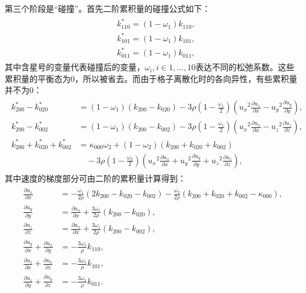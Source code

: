 第三个阶段是“碰撞”。首先二阶累积量的碰撞公式如下：
\begin{align}
    \begin{split}
& k_{110}^{*}=\left(1-\omega_{1}\right) k_{110}, \\
& k_{101}^{*}=\left(1-\omega_{1}\right) k_{101}, \\
& k_{011}^{*}=\left(1-\omega_{1}\right) k_{011} ,
\end{split}
\end{align}
其中含星号的变量代表碰撞后的变量，$\omega_{i}, i \in {1,\dots,10}$表达不同的松弛系数。这些累积量的平衡态为0，所以被省去。而由于格子离散化时的各向异性，有些累积量并不为0：
\begin{align}
    \begin{split}
k_{200}^{*}-k_{020}^{*} & =\left(1-\omega_{1}\right)\left(k_{200}-k_{020}\right)-3 \rho\left(1-\frac{\omega_{1}}{2}\right)\left({u_x}^{2} \frac{\partial u_x}{\partial x}-{u_y}^{2} \frac{\partial u_y}{\partial y}\right), \\
k_{200}^{*}-k_{002}^{*} & =\left(1-\omega_{1}\right)\left(k_{200}-k_{002}\right)-3 \rho\left(1-\frac{\omega_{1}}{2}\right)\left({u_x}^{2} \frac{\partial u_x}{\partial x}-{u_z}^{2} \frac{\partial u_z}{\partial z}\right), \\
k_{200}^{*}+k_{020}^{*}+k_{002}^{*} & =\kappa_{000} \omega_{2}+\left(1-\omega_{2}\right)\left(k_{200}+k_{020}+k_{002}\right) \\
&\quad -3 \rho\left(1-\frac{\omega_{2}}{2}\right)\left({u_x}^{2} \frac{\partial u_x}{\partial x}+{u_y}^{2} \frac{\partial u_y}{\partial y}+{u_z}^{2} \frac{\partial u_z}{\partial z}\right) ,
\end{split}
\end{align}
其中速度的梯度部分可由二阶的累积量计算得到：
\begin{align}
    \begin{split}
\frac{\partial u_x}{\partial x} & =-\frac{\omega_{1}}{2 \rho}\left(2 k_{200}-k_{020}-k_{002}\right)-\frac{\omega_{2}}{2 \rho}\left(k_{200}+k_{020}+k_{002}-\kappa_{000}\right), \\
\frac{\partial u_y}{\partial y} & =\frac{\partial u_x}{\partial x}+\frac{3 \omega_{1}}{2 \rho}\left(k_{200}-k_{020}\right), \\
\frac{\partial u_z}{\partial z} & =\frac{\partial u_x}{\partial x}+\frac{3 \omega_{1}}{2 \rho}\left(k_{200}-k_{002}\right), \\
\frac{\partial u_y}{\partial x}+\frac{\partial u_x}{\partial y} & =-\frac{3 \omega_{1}}{\rho} k_{110}, \\
\frac{\partial u_z}{\partial x}+\frac{\partial u_x}{\partial z} & =-\frac{3 \omega_{1}}{\rho} k_{101}, \\
\frac{\partial u_z}{\partial y}+\frac{\partial u_y}{\partial z} & =-\frac{3 \omega_{1}}{\rho} k_{011}.
\end{split}
\end{align}
